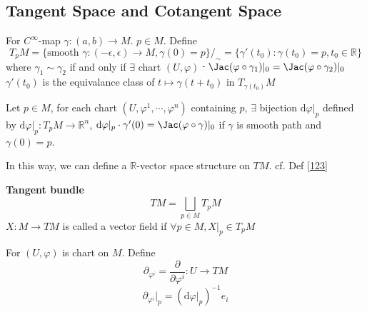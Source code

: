 \subsection{Tangent Space and Cotangent Space}
\begin{definition}
    For  $ C^\infty $-map  $ \gamma:(a,b)\rightarrow M $.  $ p\in M $. Define 
    \[T_p M =\{\text{smooth }\gamma:(-\epsilon,\epsilon)\rightarrow M,\gamma(0)=p\}/_{\sim}=\{\gamma'(t_0):\gamma(t_0)=p,t_0\in\mathbb{R}\}\]   
    where  $ \gamma_1\sim \gamma_2 $ if and only if  $ \exists $ chart  $ (U,\varphi) $ \st \, $ \Jac(\varphi\circ \gamma_1)|_0= \Jac(\varphi\circ \gamma_2)|_0 $ \\
     $ \gamma'(t_0) $ is the equivalance class of  $ t\mapsto \gamma(t+t_0) $ in  $ T_{\gamma(t_0)}M $     
\end{definition}
\begin{theorem}
    Let  $ p\in M $, for each chart  $ (U,\varphi^1,\cdots,\varphi^n) $ containing  $ p  $,  $ \exists $ bijection  $ \mathrm{d}\varphi|_p $ defined by  $ \mathrm{d}\varphi|_p:T_pM\rightarrow \mathbb{R}^n $,  $ \mathrm{d}\varphi|_p\cdot \gamma'(0)=\Jac(\varphi\circ \gamma)|_0 $ if  $ \gamma $ is smooth path and  $ \gamma(0)=p $. 
\end{theorem}
\begin{remark}
    In this way, we can define a  $ \mathbb{R} $-vector space structure on  $ TM $. cf. Def \ref{123}  
\end{remark}
\begin{definition}\label{123}
    \textbf{Tangent bundle}
    \[TM=\bigsqcup\limits_{p\in M}T_pM\]
     $ X:M\rightarrow TM  $ is called a vector field if  $ \forall p\in M, X|_p\in T_pM $ 
\end{definition}
\begin{definition}
    For  $ (U,\varphi) $ is chart on  $ M  $. Define
    \[\partial_{\varphi^i}=\frac{\partial}{\partial \varphi^i}:U\rightarrow TM\]
    \[\partial_{\varphi^i}|_p=(\mathrm{d}\varphi|_p)^{-1}e_i\]
\end{definition}